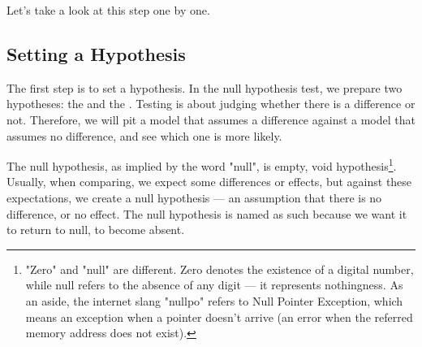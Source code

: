 \documentclass{ltjsbook}
\begin{document}
Let's take a look at this step one by one.
\subsection{Setting a Hypothesis}
The first step is to set a hypothesis. In the null hypothesis test, we prepare two hypotheses: the  and the . Testing is about judging whether there is a difference or not. Therefore, we will pit a model that assumes a difference against a model that assumes no difference, and see which one is more likely.

The null hypothesis, as implied by the word "null", is empty, void hypothesis\footnote{"Zero" and "null" are different. Zero denotes the existence of a digital number, while null refers to the absence of any digit — it represents nothingness. As an aside, the internet slang "nullpo" refers to Null Pointer Exception, which means an exception when a pointer doesn't arrive (an error when the referred memory address does not exist).}. Usually, when comparing, we expect some differences or effects, but against these expectations, we create a null hypothesis — an assumption that there is no difference, or no effect. The null hypothesis is named as such because we want it to return to null, to become absent.
\end{document}
